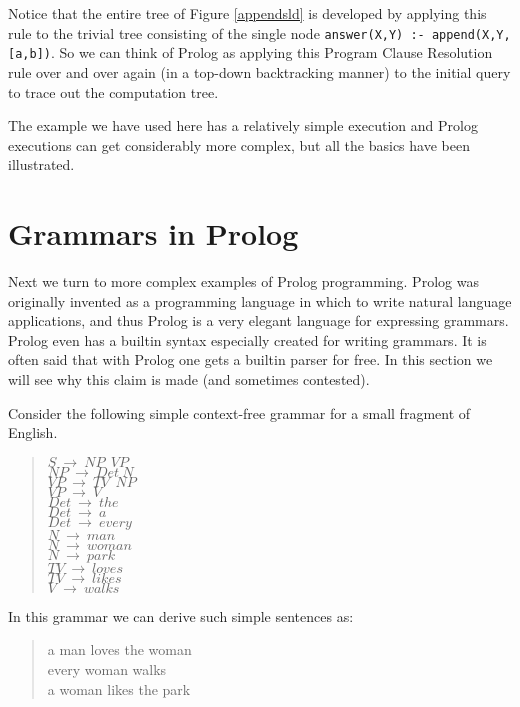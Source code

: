 Notice that the entire tree of Figure \ref{appendsld} is developed by
applying this rule to the trivial tree consisting of the single node
\verb|answer(X,Y) :- append(X,Y,[a,b])|.  So we can think of 
Prolog as applying this {\sc Program Clause Resolution} rule over and
over again (in a top-down backtracking manner) to the initial query to
trace out the computation tree.  

The example we have used here has a relatively simple execution and
Prolog executions can get considerably more complex, but all the
basics have been illustrated.

\section{Grammars in Prolog}

Next we turn to more complex examples of Prolog programming.  Prolog
was originally invented as a programming language in which to write
natural language applications, and thus Prolog is a very elegant
language for expressing grammars.  Prolog even has a builtin syntax
especially created for writing grammars.  It is often said that with
Prolog one gets a builtin parser for free.  In this section we will
see why this claim is made (and sometimes contested).

Consider the following simple context-free grammar for a small
fragment of English.
\begin{verse}
$S~ \longrightarrow ~NP ~~VP$ \\
$NP~ \longrightarrow ~Det~ N$ \\
$VP~ \longrightarrow ~TV~~ NP$ \\
$VP~ \longrightarrow ~V$ \\
$Det~ \longrightarrow ~the$ \\
$Det~ \longrightarrow ~a$ \\
$Det~ \longrightarrow ~every$ \\
$N~ \longrightarrow ~man$ \\
$N~ \longrightarrow ~woman$ \\
$N~ \longrightarrow ~park$ \\
$TV~ \longrightarrow ~loves$ \\
$TV~ \longrightarrow ~likes$ \\
$V~ \longrightarrow ~walks$ \\
\end{verse}

In this grammar we can derive such simple sentences as:
\begin{verse}
a man loves the woman\\
every woman walks\\
a woman likes the park\\
\end{verse}

